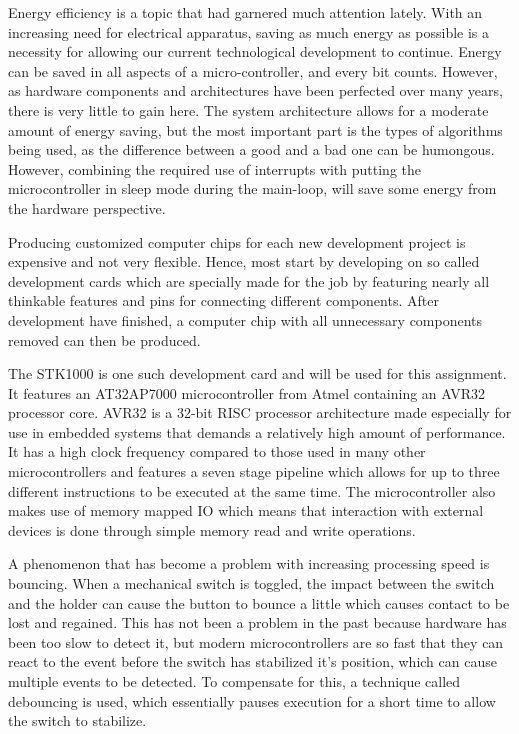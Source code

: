 Energy efficiency is a topic that had garnered much attention lately. With an increasing need for electrical apparatus, saving as much energy as possible is a necessity for allowing our current technological development to continue. Energy can be saved in all aspects of a micro-controller, and every bit counts. However, as hardware components and architectures have been perfected over many years, there is very little to gain here. The system architecture allows for a moderate amount of energy saving, but the most important part is the types of algorithms being used, as the difference between a good and a bad one can be humongous. However, combining the required use of interrupts with putting the microcontroller in sleep mode during the main-loop, will save some energy from the hardware perspective. 

Producing customized computer chips for each new development project is expensive and not very flexible. Hence, most start by developing on so called development cards which are specially made for the job by featuring nearly all thinkable features and pins for connecting different components. After development have finished, a computer chip with all unnecessary components removed can then be produced.

The STK1000 is one such development card and will be used for this assignment. It features an AT32AP7000 \cite{ap7000} microcontroller from Atmel containing an AVR32 \cite{avr32} processor core. AVR32 is a 32-bit RISC processor architecture made especially for use in embedded systems that demands a relatively high amount of performance. It has a high clock frequency compared to those used in many other microcontrollers and features a seven stage pipeline which allows for up to three different instructions to be executed at the same time. The microcontroller also makes use of memory mapped IO which means that interaction with external devices is done through simple memory read and write operations.

A phenomenon that has become a problem with increasing processing speed is bouncing. When a mechanical switch is toggled, the impact between the switch and the holder can cause the button to bounce a little which causes contact to be lost and regained. This has not been a problem in the past because hardware has been too slow to detect it, but modern microcontrollers are so fast that they can react to the event before the switch has stabilized it’s position, which can cause multiple events to be detected. To compensate for this, a technique called debouncing is used, which essentially pauses execution for a short time to allow the switch to stabilize.

